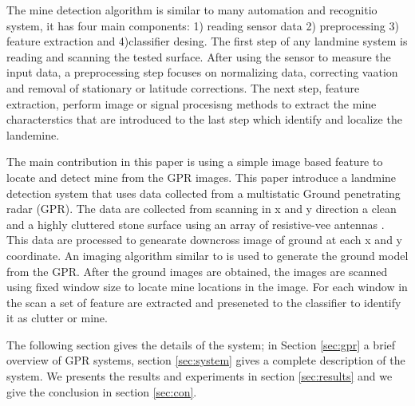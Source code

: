 \documentclass[conference]{IEEEtran}
\begin{document}


The mine detection algorithm is similar to many automation and recognitio system, it has four main components: 1) reading sensor data 2) preprocessing 3) feature extraction and 4)classifier desing. The first step of any landmine system is reading and scanning the tested surface. After using the sensor to measure the input data, a preprocessing step focuses on normalizing data, correcting vaation and removal of stationary or latitude corrections. The next step, feature extraction, perform image or signal procesisng methods to extract the mine characterstics that are introduced to the last step which identify and localize the landemine.

The main contribution in this paper is using a simple image based feature to locate and detect mine from the GPR images. This paper introduce a landmine detection system that uses data collected from a multistatic Ground penetrating radar (GPR). The data are collected from scanning in x and y direction a clean and a highly cluttered stone surface using an array of resistive-vee antennas \cite{Counts2007} . This data are processed to genearate downcross image of ground at each x and y coordinate. An imaging algorithm similar to   \cite{Counts2007} is used to generate the ground model from the GPR.  After the ground images are obtained, the images are scanned using fixed window size to locate mine locations in the image. For each window in the scan a set of feature are extracted and preseneted to the classifier to identify it as clutter or mine.


The following section gives the details of the system; in Section  \ref{sec:gpr} a brief overview of GPR systems, section \ref{sec:system} gives a complete description of the system.  We presents the results and experiments in section \ref{sec:results} and we give the conclusion in section \ref{sec:con}.
\end{document}
